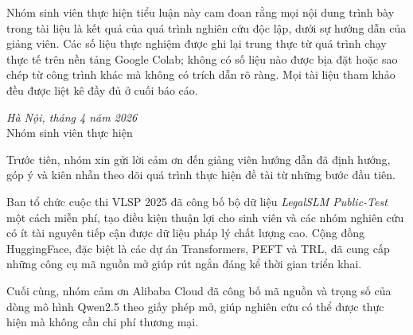 \documentclass[fontsize=13pt,a4paper,oneside,DIV=calc,chapterprefix=true]{scrbook}
\begin{document}
\coverpage
\secondcoverpage

\frontmatter

\begin{declaration}
Nhóm sinh viên thực hiện tiểu luận này cam đoan rằng mọi nội dung trình bày trong tài liệu
là kết quả của quá trình nghiên cứu độc lập, dưới sự hướng dẫn của giảng viên. Các số liệu
thực nghiệm được ghi lại trung thực từ quá trình chạy thực tế trên nền tảng Google Colab;
không có số liệu nào được bịa đặt hoặc sao chép từ công trình khác mà không có trích dẫn
rõ ràng. Mọi tài liệu tham khảo đều được liệt kê đầy đủ ở cuối báo cáo.

\vspace{1cm}
\hfill\textit{Hà Nội, tháng 4 năm 2026}\\[0.5cm]
\hfill Nhóm sinh viên thực hiện
\end{declaration}

\begin{acknowledgments}
Trước tiên, nhóm xin gửi lời cảm ơn đến giảng viên hướng dẫn đã định hướng, góp ý và
kiên nhẫn theo dõi quá trình thực hiện đề tài từ những bước đầu tiên.

Ban tổ chức cuộc thi VLSP 2025 đã công bố bộ dữ liệu \textit{LegalSLM Public-Test} một cách
miễn phí, tạo điều kiện thuận lợi cho sinh viên và các nhóm nghiên cứu có ít tài nguyên tiếp
cận được dữ liệu pháp lý chất lượng cao. Cộng đồng HuggingFace, đặc biệt là các dự án
Transformers, PEFT và TRL, đã cung cấp những công cụ mã nguồn mở giúp rút ngắn đáng kể thời
gian triển khai.

Cuối cùng, nhóm cảm ơn Alibaba Cloud đã công bố mã nguồn và trọng số của dòng mô hình
Qwen2.5 theo giấy phép mở, giúp nghiên cứu có thể được thực hiện mà không cần chi phí
thương mại.
\end{acknowledgments}
\end{document}
